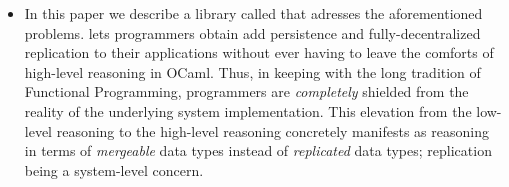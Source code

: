 \begin{itemize}
  \item In this paper we describe a library called \name that adresses
  the aforementioned problems. \name lets programmers obtain add
  persistence and fully-decentralized replication to their
  applications without ever having to leave the comforts of high-level
  reasoning in OCaml. Thus, in keeping with the long tradition of
  Functional Programming, programmers are \emph{completely} shielded
  from the reality of the underlying system implementation. This
  elevation from the low-level reasoning to the high-level reasoning
  concretely manifests as reasoning in terms of \emph{mergeable} data
  types instead of \emph{replicated} data types; replication being a
  system-level concern.

\end{itemize}
